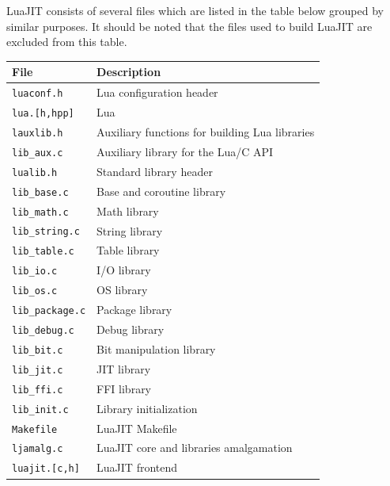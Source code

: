 LuaJIT consists of several files which are listed in the table below grouped by similar purposes. It should be noted that the files used to build LuaJIT are excluded from this table. 
\begin{center}
\begin{longtable}{|p{4cm}|p{9cm}|}
\hline
\textbf{File} & \textbf{Description}\\

\hline

\texttt{luaconf.h} & Lua configuration header\\
\texttt{lua.[h,hpp]} & Lua\\

\hline

\texttt{lauxlib.h} & Auxiliary functions for building Lua libraries\\
\texttt{lib\_aux.c} & Auxiliary library for the Lua/C API\\

\hline

\texttt{lualib.h} & Standard library header\\
\texttt{lib\_base.c} & Base and coroutine library\\
\texttt{lib\_math.c} & Math library\\
\texttt{lib\_string.c} & String library\\
\texttt{lib\_table.c} & Table library\\
\texttt{lib\_io.c} & I/O library\\
\texttt{lib\_os.c} & OS library\\
\texttt{lib\_package.c} & Package library\\
\texttt{lib\_debug.c} & Debug library\\
\texttt{lib\_bit.c} & Bit manipulation library\\
\texttt{lib\_jit.c} & JIT library\\
\texttt{lib\_ffi.c} & FFI library\\

\hline

\texttt{lib\_init.c} & Library initialization\\
\texttt{Makefile} & LuaJIT Makefile\\
\texttt{ljamalg.c} & LuaJIT core and libraries amalgamation\\
\texttt{luajit.[c,h]} & LuaJIT frontend\\

\hline


\end{longtable}
\end{center}
